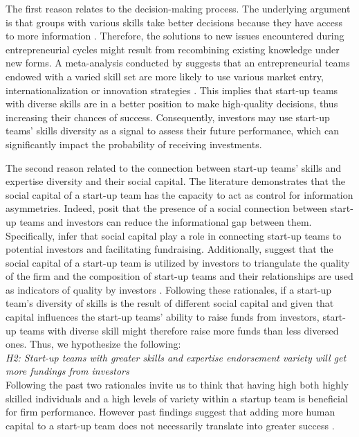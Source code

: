 \documentclass[12pt]{article}
\begin{document}
The first reason relates to the decision-making process. The underlying argument is that groups with various skills take better decisions because they have access to more information \citep{hong2001problem}. Therefore, the solutions to new issues encountered during entrepreneurial cycles might result from recombining existing knowledge under new forms. A meta-analysis conducted by \citet{jin2017entrepreneurial} suggests that an entrepreneurial teams endowed with a varied skill set are more likely to use various market entry, internationalization or innovation strategies \citep{boeker1989strategic}. This implies that start-up teams with diverse skills are in a better position to make high-quality decisions, thus increasing their chances of success. Consequently, investors may use start-up teams' skills diversity as a signal to assess their future performance, which can significantly impact the probability of receiving investments.

The second reason related to the connection between start-up teams' skills and expertise diversity and their social capital. The literature demonstrates that the social capital of a start-up team has the capacity to act as control for information asymmetries. Indeed, \citet{huang2017resources, shane2002organizational} posit that the presence of a social connection between start-up teams and investors can reduce the informational gap between them. Specifically, \citet{shane2002network} infer that social capital play a role in connecting start-up teams to potential investors and facilitating fundraising. Additionally, \citet{hoenig2015quality} suggest that the social capital of a start-up team is utilized by investors to triangulate the quality of the firm and the composition of start-up teams and their relationships are used as indicators of quality by investors \citep{plummer2016better, semrau2014exactly}. Following these rationales, if a start-up team's diversity of skills is the result of different social capital and given that capital influences the start-up teams' ability to raise funds from investors, start-up teams with diverse skill might therefore raise more funds than less diversed ones. Thus, we hypothesize the following: \\

\noindent \textit{H2: Start-up teams with greater skills and expertise endorsement variety will get more fundings from investors} \\

Following the past two rationales invite us to think that having high both highly skilled individuals and a high levels of variety within a startup team is beneficial for firm performance. However past findings suggest that adding more human capital to a start-up team does not necessarily translate into greater success \citep{pierce2013too}.
\end{document}
